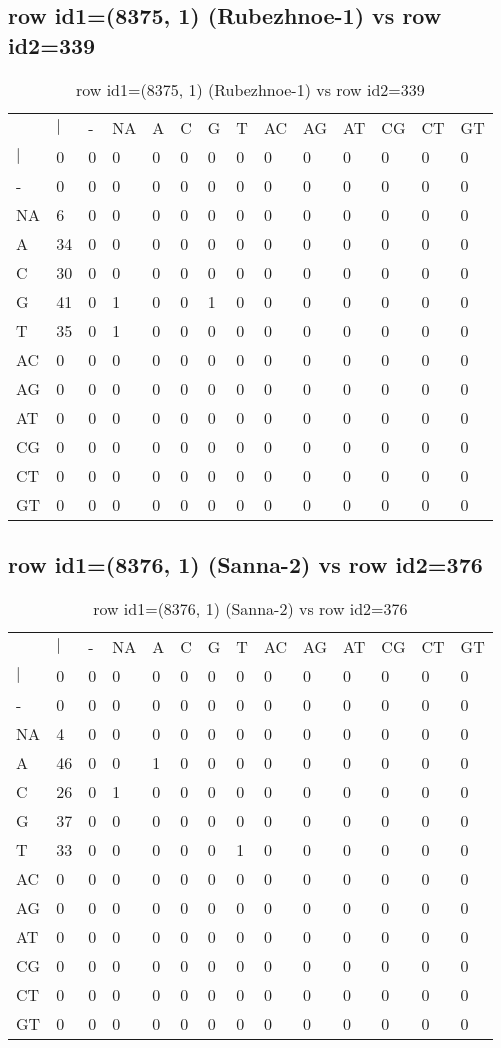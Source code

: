 \subsection{row id1=(8375, 1) (Rubezhnoe-1) vs row id2=339}
\begin{center}
\begin{longtable}{|l|l|l|l|l|l|l|l|l|l|l|l|l|l|}
\caption{row id1=(8375, 1) (Rubezhnoe-1) vs row id2=339} \label{table_dm410}\\
\hline
\\
\hline
&$|$&-&NA&A&C&G&T&AC&AG&AT&CG&CT&GT\\
$|$&0&0&0&0&0&0&0&0&0&0&0&0&0\\
-&0&0&0&0&0&0&0&0&0&0&0&0&0\\
NA&6&0&0&0&0&0&0&0&0&0&0&0&0\\
A&34&0&0&0&0&0&0&0&0&0&0&0&0\\
C&30&0&0&0&0&0&0&0&0&0&0&0&0\\
G&41&0&1&0&0&1&0&0&0&0&0&0&0\\
T&35&0&1&0&0&0&0&0&0&0&0&0&0\\
AC&0&0&0&0&0&0&0&0&0&0&0&0&0\\
AG&0&0&0&0&0&0&0&0&0&0&0&0&0\\
AT&0&0&0&0&0&0&0&0&0&0&0&0&0\\
CG&0&0&0&0&0&0&0&0&0&0&0&0&0\\
CT&0&0&0&0&0&0&0&0&0&0&0&0&0\\
GT&0&0&0&0&0&0&0&0&0&0&0&0&0\\
\hline
\end{longtable}
\end{center}

\subsection{row id1=(8376, 1) (Sanna-2) vs row id2=376}
\begin{center}
\begin{longtable}{|l|l|l|l|l|l|l|l|l|l|l|l|l|l|}
\caption{row id1=(8376, 1) (Sanna-2) vs row id2=376} \label{table_dm412}\\
\hline
\\
\hline
&$|$&-&NA&A&C&G&T&AC&AG&AT&CG&CT&GT\\
$|$&0&0&0&0&0&0&0&0&0&0&0&0&0\\
-&0&0&0&0&0&0&0&0&0&0&0&0&0\\
NA&4&0&0&0&0&0&0&0&0&0&0&0&0\\
A&46&0&0&1&0&0&0&0&0&0&0&0&0\\
C&26&0&1&0&0&0&0&0&0&0&0&0&0\\
G&37&0&0&0&0&0&0&0&0&0&0&0&0\\
T&33&0&0&0&0&0&1&0&0&0&0&0&0\\
AC&0&0&0&0&0&0&0&0&0&0&0&0&0\\
AG&0&0&0&0&0&0&0&0&0&0&0&0&0\\
AT&0&0&0&0&0&0&0&0&0&0&0&0&0\\
CG&0&0&0&0&0&0&0&0&0&0&0&0&0\\
CT&0&0&0&0&0&0&0&0&0&0&0&0&0\\
GT&0&0&0&0&0&0&0&0&0&0&0&0&0\\
\hline
\end{longtable}
\end{center}

